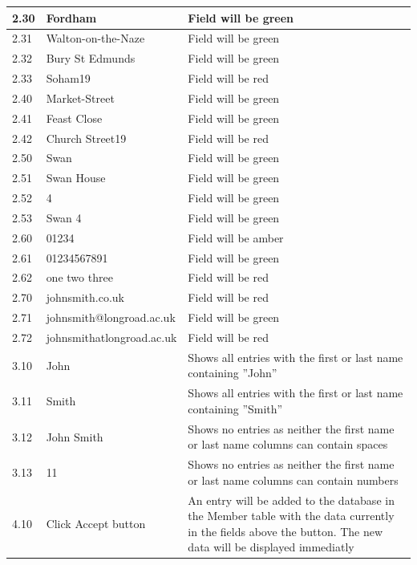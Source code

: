 \begin{landscape}
\begin{center}
\begin{longtable}{|p{2cm}|p{5cm}|p{8cm}|}
        2.30 & Fordham & Field will be green \\ \hline
        2.31 & Walton-on-the-Naze & Field will be green \\ \hline
        2.32 & Bury St Edmunds & Field will be green \\ \hline
        2.33 & Soham19 & Field will be red\\ \hline

        2.40 & Market-Street & Field will be green \\ \hline
        2.41 & Feast Close & Field will be green \\ \hline
        2.42 & Church Street19 & Field will be red\\ \hline
        
        2.50 & Swan & Field will be green \\ \hline
        2.51 & Swan House & Field will be green \\ \hline
        2.52 & 4 & Field will be green \\ \hline
        2.53 & Swan 4 & Field will be green \\ \hline
        
        2.60 & 01234 & Field will be amber \\ \hline
        2.61 & 01234567891 & Field will be green \\ \hline
        2.62 & one two three & Field will be red \\ \hline
       
        2.70 & johnsmith.co.uk & Field will be red \\ \hline
        2.71 & johnsmith@longroad.ac.uk & Field will be green \\ \hline
        2.72 & johnsmithatlongroad.ac.uk & Field will be red \\ \hline
        
        3.10 & John & Shows all entries with the first or last name containing ''John'' \\ \hline
        3.11 & Smith & Shows all entries with the first or last name containing ''Smith'' \\ \hline
        3.12 & John Smith &  Shows no entries as neither the first name or last name columns can contain spaces \\ \hline
        3.13 & 11 & Shows no entries as neither the first name or last name columns can contain numbers \\ \hline
        
        4.10 & Click Accept button & An entry will be added to the database in the Member table with the data currently in the fields above the button. The new data will be displayed immediatly \\ \hline
        

\end{longtable}
\end{center}
\end{landscape}
